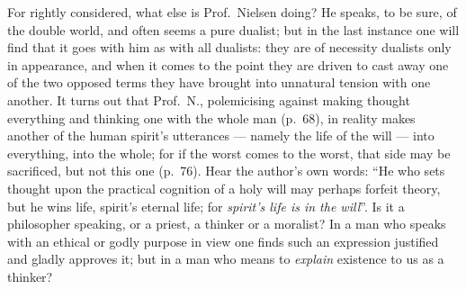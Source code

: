 \documentclass[12pt,a4paper]{book}
\newcommand{\opage}[1]{\marginnote{\footnotesize\textit{[#1]}}}
\begin{document}
For rightly considered, what else is Prof.\ Nielsen doing? He speaks, to be
sure, of the double world, and often seems a pure dualist; but in the last
instance one will find that it goes with him as with all dualists: they are of
necessity dualists only in appearance, and when it comes to the point they are
driven to cast away one of the two opposed terms they have brought into
\opage{65}unnatural tension with one another. It turns out that Prof.\ N.,
polemicising against making thought everything and thinking one with the whole
man (p.\ 68), in reality makes another of the human spirit's utterances ---
namely the life of the will --- into everything, into the whole; for if the
worst comes to the worst, that side may be sacrificed, but not this one (p.\
76). Hear the author's own words: ``He who sets thought upon the practical
cognition of a holy will may perhaps forfeit theory, but he wins life, spirit's
eternal life; for \emph{spirit's life is in the will}''. Is it a philosopher
speaking, or a priest, a thinker or a moralist? In a man who speaks with an
ethical or godly purpose in view one finds such an expression justified and
gladly approves it; but in a man who means to \emph{explain} existence to us as
a thinker?
\end{document}

